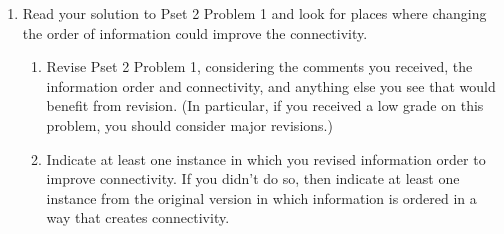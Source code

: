 \documentclass[11pt]{article}
\begin{document}
\begin{enumerate}
\item Read your solution to Pset 2 Problem 1 and look for places where changing the order of information could improve the connectivity.
\begin{enumerate}
\item Revise Pset 2 Problem 1, considering the comments you received, the information order and connectivity, and anything else you see that would benefit from revision. (In particular, if you received a low grade on this problem, you should consider major revisions.)
\item Indicate at least one instance in which you revised information order to improve connectivity. If you didn't do so, then indicate at least one instance from the original version in which information is ordered in a way that creates connectivity.
\end{enumerate}
\end{enumerate}
\end{document}
